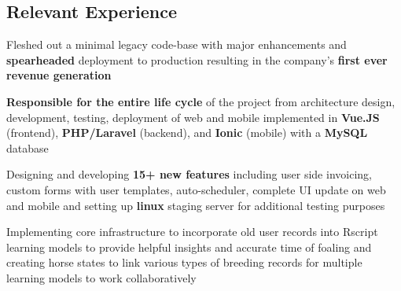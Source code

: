 \documentclass[letterpaper]{deedy-resume}
\begin{document}
\begin{center}
\begin{minipage}[t]{0.29\textwidth}
\end{minipage} 
\hfill
\begin{minipage}[t]{0.66\textwidth} 

\vspace{-5mm}
\section{Relevant Experience}
\sectionspace
{}
\vspace{\topsep}
\sectionspace
\begin{tightitemize}

\item  Fleshed out a minimal legacy code-base with major enhancements and \textbf{spearheaded} deployment to production resulting in the company’s \textbf{first ever revenue generation} 
\vspace{1mm}
\item \textbf{Responsible for the entire life cycle} of the project from architecture design, development, testing, deployment of web and mobile implemented in \textbf{Vue.JS} (frontend), \textbf{PHP/Laravel} (backend), and \textbf{Ionic} (mobile) with a \textbf{MySQL} database
\vspace{1mm}
\item Designing and developing \textbf{15+ new features} including user side invoicing, custom forms with user templates, auto-scheduler, complete UI update on web and mobile and setting up \textbf{linux} staging server for additional testing purposes
\vspace{1mm}
\item Implementing core infrastructure to incorporate old user records into Rscript learning models to provide helpful insights and accurate time of foaling and creating horse states to link various types of breeding records for multiple learning models to work collaboratively 

\end{tightitemize}

\sectionspace


\end{minipage}
\end{center}
\end{document}
